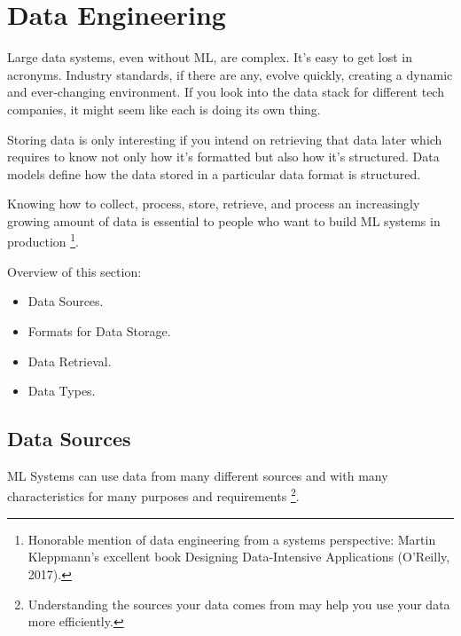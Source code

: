 \section{Data Engineering}
Large data systems, even without ML, are complex. It's easy to get
lost in acronyms.  Industry standards, if there are any, evolve
quickly, creating a dynamic and ever-changing environment. If you
look into the data stack for different tech companies, it might seem
like each is doing its own thing.

Storing data is only interesting if you intend on retrieving that
data later which requires to know not only how it's formatted but
also how it's structured. Data models define how the data stored in
a particular data format is structured.

Knowing how to collect, process, store, retrieve, and process an
increasingly growing amount of data is essential to people who want
to build ML systems in production
\footnote{
    Honorable mention of data engineering from a systems perspective:
    Martin Kleppmann's excellent book Designing Data-Intensive
    Applications (O'Reilly, 2017).
}.

Overview of this section:
\begin{itemize}
    \item Data Sources.
    \item Formats for Data Storage.
    \item Data Retrieval.
    \item Data Types.
\end{itemize}



\subsection{Data Sources}
ML Systems can use data from many different sources and with many
characteristics for many purposes and requirements
\footnote{
    Understanding the sources your data comes from may help you use
    your data more efficiently.
}.

